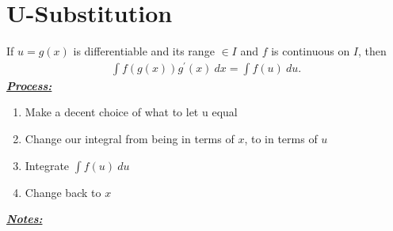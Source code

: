 \documentclass{report}
\begin{document}
    \section{\Large{U-Substitution}}
          \bigbreak \noindent \bigbreak \noindent
      If $u=g(x)$ is differentiable and its range $\in I $ and $f $ is continuous on $I$, then
      \begin{align*}
        \int f(g(x))g^{\prime}(x)\ dx = \int f(u)\ du
      .\end{align*}
      \bigbreak \noindent \bigbreak \noindent
      \textbf{\textit{\underline{Process:}}}
      \begin{enumerate}
        \item Make a decent choice of what to let u equal
        \item Change our integral from being in terms of $x$, to in terms of $u$
        \item Integrate $\int f(u)\ du $
        \item Change back to $x$
      \end{enumerate}
      \bigbreak \noindent \bigbreak \noindent
      \bigbreak \noindent \bigbreak \noindent
      \textbf{\textit{\underline{Notes:}}}
\end{document}
